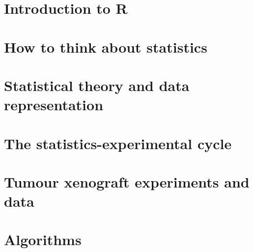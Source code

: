 \documentclass[12pt,a4paper]{report}
\title{}
\author{}
\date{}
\begin{document}
\tableofcontents

\chapter{Introduction to R}


\chapter{How to think about statistics}


\chapter{Statistical theory and data representation}


\chapter{The statistics-experimental cycle}


\chapter{Tumour xenograft experiments and data}


% 

\chapter{Algorithms}


\printbibliography
\end{document}
